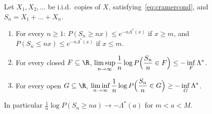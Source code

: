 \begin{theorem}[Cram\'er]\label{thm:cramerR}
Let $X_1,X_2,\dots$ be i.i.d.\ copies of $X$, satisfying~\eqref{eq:cramercond}, and $S_n=X_1+\dots+X_n$.
\begin{enumerate}[label=(\alph*)]
\item For every $n\ge1$: $P(S_n\ge nx)\le e^{-n\Lambda^*(x)}$ if $x\ge m$, and $P(S_n\le nx)\le e^{-n\Lambda^*(x)}$ if $x\le m$.
\item For every closed $F\subseteq\R$, $\displaystyle\limsup_{n\to\infty}\frac1n\log P\Bigl(\frac{S_n}n\in F\Bigr)\le-\inf_F\Lambda^*$.
\item For every open $G\subseteq\R$, $\displaystyle\liminf_{n\to\infty}\frac1n\log P\Bigl(\frac{S_n}n\in G\Bigr)\ge-\inf_G\Lambda^*$.
\end{enumerate}
In particular $\frac1n\log P(S_n\ge na)\to-\Lambda^*(a)$ for $m<a<M$.
\end{theorem}
